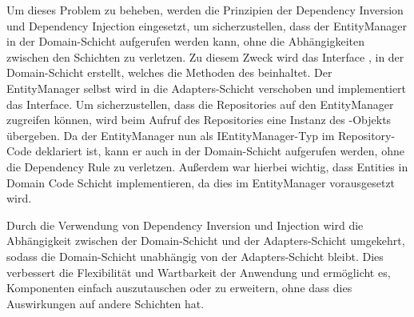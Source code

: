 Um dieses Problem zu beheben, werden die Prinzipien der Dependency Inversion und Dependency Injection eingesetzt, um sicherzustellen, dass der EntityManager in der Domain-Schicht aufgerufen werden kann, ohne die Abhängigkeiten zwischen den Schichten zu verletzen.
Zu diesem Zweck wird das Interface \href{https://github.com/MichaelaHaag/RezeptApp/tree/main/3-Domain-Code/src/main/java/de/rezeptapp/domain/IEntityManager.java}{}, in der Domain-Schicht erstellt, welches die Methoden des  beinhaltet. Der EntityManager selbst wird in die Adapters-Schicht verschoben und implementiert das  Interface. Um sicherzustellen, dass die Repositories auf den EntityManager zugreifen können, wird beim Aufruf des Repositories eine Instanz des -Objekts übergeben. Da der EntityManager nun als IEntityManager-Typ im Repository-Code deklariert ist, kann er auch in der Domain-Schicht aufgerufen werden, ohne die Dependency Rule zu verletzen. Außerdem war hierbei wichtig, dass Entities in Domain Code Schicht \href{https://github.com/MichaelaHaag/RezeptApp/tree/main/3-Domain-Code/src/main/java/de/rezeptapp/domain/IPersistierbar.java}{} implementieren, da dies im EntityManager vorausgesetzt wird. 

Durch die Verwendung von Dependency Inversion und Injection wird die Abhängigkeit zwischen der Domain-Schicht und der Adapters-Schicht umgekehrt, sodass die Domain-Schicht unabhängig von der Adapters-Schicht bleibt. Dies verbessert die Flexibilität und Wartbarkeit der Anwendung und ermöglicht es, Komponenten einfach auszutauschen oder zu erweitern, ohne dass dies Auswirkungen auf andere Schichten hat.


